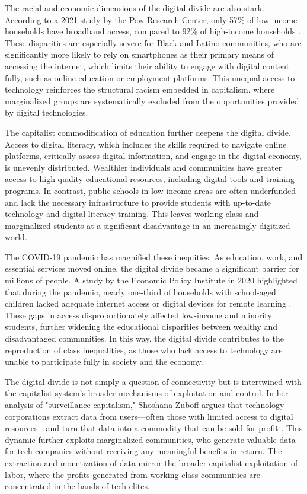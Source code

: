 The racial and economic dimensions of the digital divide are also stark. According to a 2021 study by the Pew Research Center, only 57\% of low-income households have broadband access, compared to 92\% of high-income households \cite[pp.~38-40]{pew2021}. These disparities are especially severe for Black and Latino communities, who are significantly more likely to rely on smartphones as their primary means of accessing the internet, which limits their ability to engage with digital content fully, such as online education or employment platforms. This unequal access to technology reinforces the structural racism embedded in capitalism, where marginalized groups are systematically excluded from the opportunities provided by digital technologies.

The capitalist commodification of education further deepens the digital divide. Access to digital literacy, which includes the skills required to navigate online platforms, critically assess digital information, and engage in the digital economy, is unevenly distributed. Wealthier individuals and communities have greater access to high-quality educational resources, including digital tools and training programs. In contrast, public schools in low-income areas are often underfunded and lack the necessary infrastructure to provide students with up-to-date technology and digital literacy training. This leaves working-class and marginalized students at a significant disadvantage in an increasingly digitized world.

The COVID-19 pandemic has magnified these inequities. As education, work, and essential services moved online, the digital divide became a significant barrier for millions of people. A study by the Economic Policy Institute in 2020 highlighted that during the pandemic, nearly one-third of households with school-aged children lacked adequate internet access or digital devices for remote learning \cite[pp.~12-14]{garcia2020}. These gaps in access disproportionately affected low-income and minority students, further widening the educational disparities between wealthy and disadvantaged communities. In this way, the digital divide contributes to the reproduction of class inequalities, as those who lack access to technology are unable to participate fully in society and the economy.

The digital divide is not simply a question of connectivity but is intertwined with the capitalist system’s broader mechanisms of exploitation and control. In her analysis of "surveillance capitalism," Shoshana Zuboff argues that technology corporations extract data from users—often those with limited access to digital resources—and turn that data into a commodity that can be sold for profit \cite[pp.~90-92]{zuboff2020}. This dynamic further exploits marginalized communities, who generate valuable data for tech companies without receiving any meaningful benefits in return. The extraction and monetization of data mirror the broader capitalist exploitation of labor, where the profits generated from working-class communities are concentrated in the hands of tech elites.

